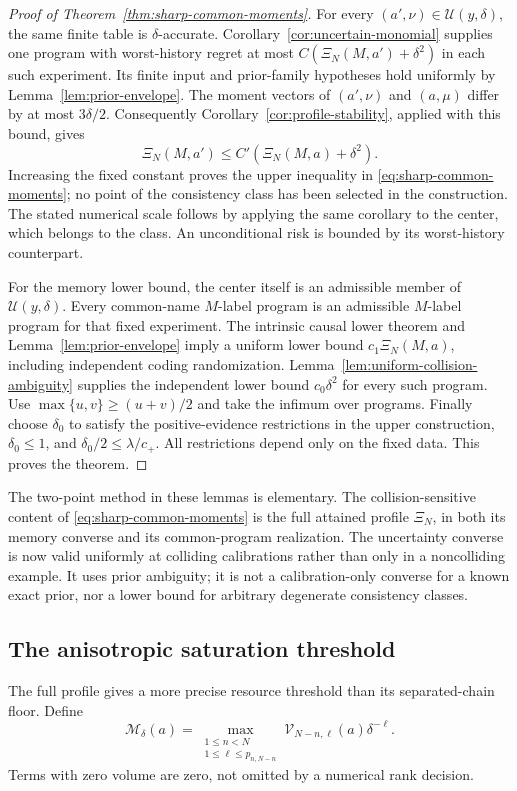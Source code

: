 \documentclass[11pt]{amsart}
\theoremstyle{definition}\newtheorem{definition}[theorem]{Definition}
\theoremstyle{remark}\newtheorem{remark}[theorem]{Remark}
\begin{document}
\begin{proof}[Proof of Theorem~\ref{thm:sharp-common-moments}]
For every $(a',\nu)\in\mathcal U(y,\delta)$, the same finite table
is $\delta$-accurate. Corollary~\ref{cor:uncertain-monomial} supplies
one program with worst-history regret at most
$C(\Xi_N(M,a')+\delta^2)$ in each such experiment. Its finite input
and prior-family hypotheses hold uniformly by
Lemma~\ref{lem:prior-envelope}. The moment vectors of $(a',\nu)$
and $(a,\mu)$ differ by at most $3\delta/2$. Consequently
Corollary~\ref{cor:profile-stability}, applied with this bound, gives
\[
 \Xi_N(M,a')\le C'(\Xi_N(M,a)+\delta^2).
\]
Increasing the fixed constant proves the upper inequality in
\eqref{eq:sharp-common-moments}; no point of the consistency class has
been selected in the construction. The stated numerical scale follows
by applying the same corollary to the center, which belongs to the class.
An unconditional risk is bounded by its worst-history counterpart.

For the memory lower bound, the center itself is an admissible member
of $\mathcal U(y,\delta)$. Every common-name $M$-label program is an
admissible $M$-label program for that fixed experiment. The intrinsic
causal lower theorem and Lemma~\ref{lem:prior-envelope} imply a
uniform lower bound $c_1\Xi_N(M,a)$, including independent coding
randomization. Lemma~\ref{lem:uniform-collision-ambiguity} supplies
the independent lower bound $c_0\delta^2$ for every such program.
Use $\max\{u,v\}\ge(u+v)/2$ and take the infimum over programs.
Finally choose $\delta_0$ to satisfy the positive-evidence restrictions
in the upper construction, $\delta_0\le1$, and
$\delta_0/2\le\lambda/c_+$. All restrictions depend only on the fixed
data. This proves the theorem.
\end{proof}

The two-point method in these lemmas is elementary. The collision-sensitive
content of \eqref{eq:sharp-common-moments} is the full attained profile
$\Xi_N$, in both its memory converse and its common-program realization.
The uncertainty converse is now valid uniformly at colliding calibrations
rather than only in a noncolliding example. It uses prior ambiguity;
it is not a calibration-only converse for a known exact prior, nor a
lower bound for arbitrary degenerate consistency classes.

\subsection{The anisotropic saturation threshold}
The full profile gives a more precise resource threshold than its
separated-chain floor. Define
\begin{equation}\label{eq:advice-saturation-index}
 \mathcal M_\delta(a)=
 \max_{\substack{1\le n<N\\1\le\ell\le p_{n,N-n}}}
       \mathcal V_{N-n,\ell}(a)\delta^{-\ell}.
\end{equation}
Terms with zero volume are zero, not omitted by a numerical rank decision.
\end{document}
